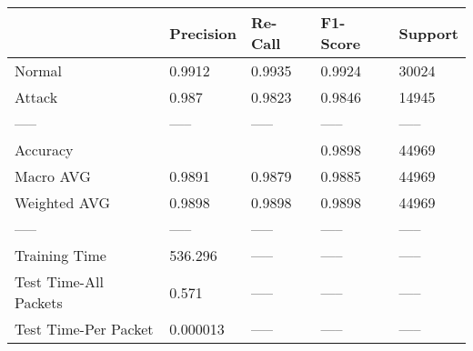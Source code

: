\begin{tabular}{lllll}
\toprule
{} & Precision & Re-Call & F1-Score & Support \\
\midrule
Normal                &    0.9912 &  0.9935 &   0.9924 &   30024 \\
Attack                &     0.987 &  0.9823 &   0.9846 &   14945 \\
-----                 &     ----- &   ----- &    ----- &   ----- \\
Accuracy              &           &         &   0.9898 &   44969 \\
Macro AVG             &    0.9891 &  0.9879 &   0.9885 &   44969 \\
Weighted AVG          &    0.9898 &  0.9898 &   0.9898 &   44969 \\
-----                 &     ----- &   ----- &    ----- &   ----- \\
Training Time         &   536.296 &   ----- &    ----- &   ----- \\
Test Time-All Packets &     0.571 &   ----- &    ----- &   ----- \\
Test Time-Per Packet  &  0.000013 &   ----- &    ----- &   ----- \\
\bottomrule
\end{tabular}
